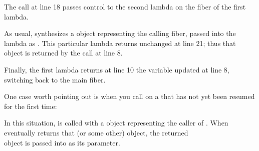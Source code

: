 
The  call at line 18 passes control to the second
lambda on the fiber of the first lambda.

As usual, \resumewith synthesizes a \fiber object representing the calling
fiber, passed into the lambda as . This particular lambda returns 
unchanged at line 21; thus that object  is returned by the \resume call
at line 8.

Finally, the first lambda returns at line 10 the  variable updated at
line 8, switching back to the main fiber.

One case worth pointing out is when you call \anyresumewith on a
\fiber that has not yet been resumed for the first time:

In this situation,  is called with a \fiber object
representing the caller of \resumewith. When  eventually
returns that (or some other) \fiber object, the returned\\
\fiber object is passed into  as its  parameter.


